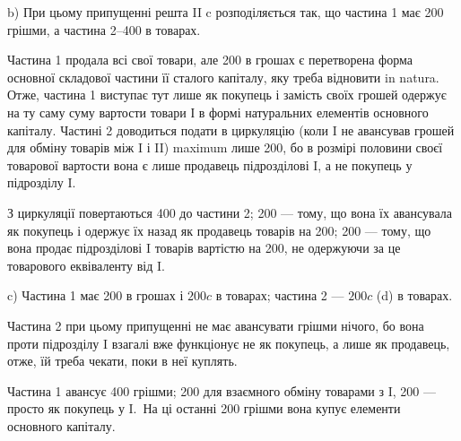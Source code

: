 b) При цьому припущенні решта II c розподіляється так, що частина
1 має 200 грішми, а частина 2--400 в товарах.

Частина 1 продала всі свої товари, але 200 в грошах є перетворена
форма основної складової частини її сталого капіталу, яку треба відновити
in natura. Отже, частина 1 виступає тут лише як покупець і замість
своїх грошей одержує на ту саму суму вартости товари І в формі натуральних
елементів основного капіталу. Частині 2 доводиться подати в
циркуляцію (коли I не авансував грошей для обміну товарів між I і II)
maximum лише 200, бо в розмірі половини своєї товарової
вартости вона є лише продавець підрозділові I, а не покупець у
підрозділу I.

З циркуляції повертаються 400 до частини 2; 200 — тому,
що вона їх авансувала як покупець і одержує їх назад як продавець
товарів на 200; 200 — тому, що вона продає підрозділові I товарів вартістю
на 200, не одержуючи за це товарового еквіваленту від I.

c) Частина 1 має 200 в грошах і $200 c$ в товарах; частина 2 —
$200 c$ (d) в товарах.

Частина 2 при цьому припущенні не має авансувати грішми нічого,
бо вона проти підрозділу I взагалі вже функціонує не як покупець, а
лише як продавець, отже, їй треба чекати, поки в неї куплять.

Частина 1 авансує 400 грішми; 200 для взаємного обміну
товарами з I, 200 — просто як покупець у I.~На ці останні 200
грішми вона купує елементи основного капіталу.
